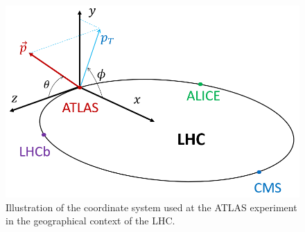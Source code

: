 \begin{figure}[bht]
	\begin{centering}	
	\includegraphics[width=.75\textwidth]{Detector_plots/ATLAS coordinate system.png}
	\caption{Illustration of the coordinate system
	used at the ATLAS experiment in the geographical context of the LHC.
		}
	\label{fig:ATLAS_coordinate_system}
	\end{centering}
\end{figure}


